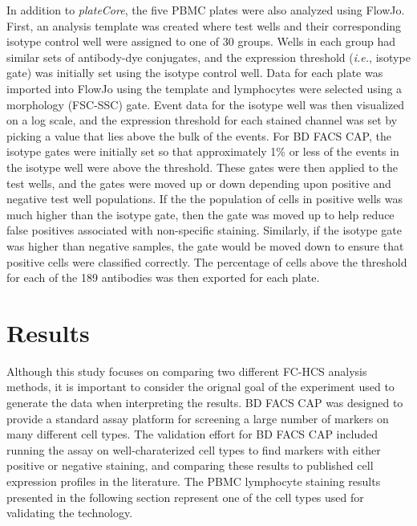\documentclass[12pt]{article}
\newcommand{\Rpackage}[1]{{\textit{#1}}}
\begin{document}
In addition to \Rpackage{plateCore}, the five PBMC plates were also analyzed
using FlowJo. First, an analysis template was created where test wells and
their corresponding isotype control well were assigned to one of 30 groups.
Wells in each group had similar sets of antibody-dye conjugates, and
the expression threshold (\emph{i.e.}, isotype gate) was initially set using
the isotype control well. Data for each plate was imported into FlowJo using
the template and lymphocytes were selected using a morphology (FSC-SSC) gate.
Event data for the isotype well was then visualized on a log scale, and the
expression threshold for each stained channel was set by picking a value that
lies above the bulk of the events. For BD FACS CAP, the isotype gates were
initially set so that approximately 1\% or less of the events in the isotype
well were above the threshold. These gates were then applied to the test wells,
and the gates were moved up or down depending upon positive and negative test
well populations. If the the population of cells in positive wells was much
higher than the isotype gate, then the gate was moved up to help reduce false
positives associated with non-specific staining.  Similarly, if the isotype
gate was higher than negative samples, the gate would be moved down to ensure
that positive cells were classified correctly. The percentage of cells above
the threshold for each of the 189 antibodies was then exported for each plate.

\section*{Results}

Although this study focuses on comparing two different FC-HCS analysis methods,
it is important to consider the orignal goal of the experiment used to generate
the data when interpreting the results. BD FACS CAP was designed to provide a
standard assay platform for screening a large number of markers on many
different cell types. The validation effort for BD FACS CAP included running
the assay on well-charaterized cell types to find markers with either positive
or negative staining, and comparing these results to published cell expression
profiles in the literature. The PBMC lymphocyte staining results presented in
the following section represent one of the cell types used for validating the
technology.


\end{document}
